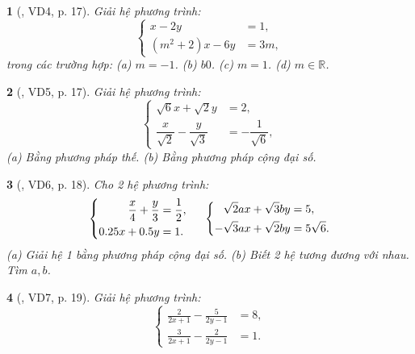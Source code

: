 \documentclass{article}
\newtheorem{baitoan}{}
\begin{document}
\begin{baitoan}[\cite{Binh_boi_duong_Toan_9_tap_2}, VD4, p. 17]
	Giải hệ phương trình:
	\begin{equation*}
		\left\{\begin{split}
			x - 2y &= 1,\\
			(m^2 + 2)x - 6y &= 3m,
		\end{split}\right.
	\end{equation*}
	trong các trường hợp: (a) $m = -1$. (b) $b 0$. (c) $m = 1$. (d) $m\in\mathbb{R}$.
\end{baitoan}

\begin{baitoan}[\cite{Binh_boi_duong_Toan_9_tap_2}, VD5, p. 17]
	Giải hệ phương trình:
	\begin{equation*}
		\left\{\begin{split}
			\sqrt{6}x + \sqrt{2}y &= 2,\\
			\dfrac{x}{\sqrt{2}} - \dfrac{y}{\sqrt{3}} &= -\dfrac{1}{\sqrt{6}},
		\end{split}\right.
	\end{equation*}
	(a) Bằng phương pháp thế. (b) Bằng phương pháp cộng đại số.
\end{baitoan}

\begin{baitoan}[\cite{Binh_boi_duong_Toan_9_tap_2}, VD6, p. 18]
	Cho 2 hệ phương trình:
	\begin{equation*}
		\left\{\begin{split}
			\frac{x}{4} + \frac{y}{3} &= \frac{1}{2},\\
			0.25x + 0.5y &= 1.
		\end{split}\right.\hspace{5mm}
		\left\{\begin{split}
			\sqrt{2}ax + \sqrt{3}by &= 5,\\
			-\sqrt{3}ax + \sqrt{2}by &= 5\sqrt{6}.
		\end{split}\right.
	\end{equation*}
	(a) Giải hệ 1 bằng phương pháp cộng đại số. (b) Biết 2 hệ tương đương với nhau. Tìm $a,b$.
\end{baitoan}

\begin{baitoan}[\cite{Binh_boi_duong_Toan_9_tap_2}, VD7, p. 19]
	Giải hệ phương trình:
	\begin{equation*}
		\left\{\begin{split}
			\frac{2}{2x + 1} - \frac{5}{2y - 1} &= 8,\\
			\frac{3}{2x + 1} - \frac{2}{2y - 1} &= 1.
		\end{split}\right.
	\end{equation*}
\end{baitoan}
\end{document}
